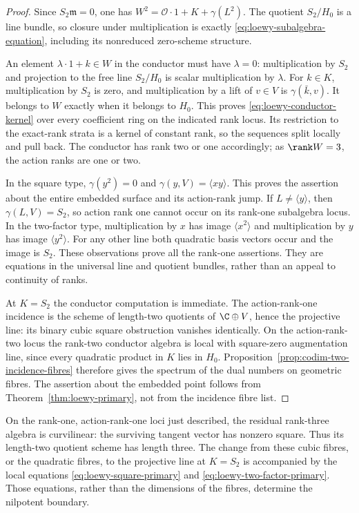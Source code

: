 \begin{proof}
Since $S_2\mathfrak m=0$, one has
$W^2=\mathcal O\cdot1+K+\gamma(L^2)$.
The quotient $S_2/H_0$ is a line bundle, so closure under multiplication
is exactly \eqref{eq:loewy-subalgebra-equation}, including its
nonreduced zero-scheme structure.

An element $\lambda\cdot1+k\in W$ in the conductor must have
$\lambda=0$: multiplication by $S_2$ and projection to the free
line $S_2/H_0$ is scalar multiplication by $\lambda$.
For $k\in K$, multiplication by $S_2$ is zero, and multiplication
by a lift of $v\in V$ is $\gamma(\bar k,v)$.
It belongs to $W$ exactly when it belongs to $H_0$.
This proves \eqref{eq:loewy-conductor-kernel} over every coefficient
ring on the indicated rank locus. Its restriction to the exact-rank
strata is a kernel of constant rank, so the sequences split locally
and pull back. The conductor has rank two or one accordingly;
as $\rank W=3$, the action ranks are one or two.

In the square type, $\gamma(y^2)=0$ and
$\gamma(y,V)=\langle xy\rangle$. This proves the assertion about
the entire embedded surface and its action-rank jump. If $L\ne
\langle y\rangle$, then $\gamma(L,V)=S_2$, so action rank one
cannot occur on its rank-one subalgebra locus.
In the two-factor type, multiplication by $x$ has image
$\langle x^2\rangle$ and multiplication by $y$ has image
$\langle y^2\rangle$. For any other line both quadratic basis
vectors occur and the image is $S_2$. These observations prove all
the rank-one assertions. They are equations in the universal line
and quotient bundles, rather than an appeal to continuity of ranks.

At $K=S_2$ the conductor computation is immediate.
The action-rank-one incidence is the scheme of length-two quotients
of $\C\oplus V$, hence the projective line: its binary cubic
square obstruction vanishes identically. On the action-rank-two
locus the rank-two conductor algebra is local with square-zero
augmentation line, since every quadratic product in $K$ lies in
$H_0$. Proposition~\ref{prop:codim-two-incidence-fibres} therefore
gives the spectrum of the dual numbers on geometric fibres.
The assertion about the embedded point follows from
Theorem~\ref{thm:loewy-primary}, not from the incidence fibre list.
\end{proof}

On the rank-one, action-rank-one loci just described, the residual
rank-three algebra is curvilinear: the surviving tangent vector has
nonzero square. Thus its length-two quotient scheme has length three.
The change from these cubic fibres, or the quadratic fibres, to the
projective line at $K=S_2$ is accompanied by the local equations
\eqref{eq:loewy-square-primary} and
\eqref{eq:loewy-two-factor-primary}. Those equations, rather than
the dimensions of the fibres, determine the nilpotent boundary.

